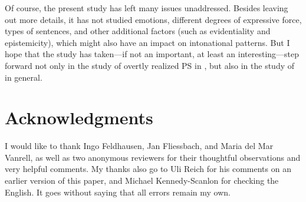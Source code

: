 \documentclass[output=paper]{langsci/langscibook}
\begin{document}
Of course, the present study has left many issues unaddressed. Besides leaving out more  details, it has not studied emotions, different degrees of expressive force, types of sentences, and other additional factors (such as evidentiality and epistemicity), which might also have an impact on intonational patterns. But I hope that the study has taken—if not an important, at least an interesting—step forward not only in the study of overtly realized PS in , but also in the study of  in general.

\section*{Acknowledgments}
I would like to thank Ingo Feldhausen, Jan Fliessbach, and Maria del Mar Vanrell, as well as two anonymous reviewers for their thoughtful observations and very helpful comments. My thanks also go to Uli Reich for his comments on an earlier version of this paper, and Michael Kennedy-Scanlon for checking the English. It goes without saying that all errors remain my own.

{\sloppy
\printbibliography[heading=subbibliography,notkeyword=this]
}
\end{document}
